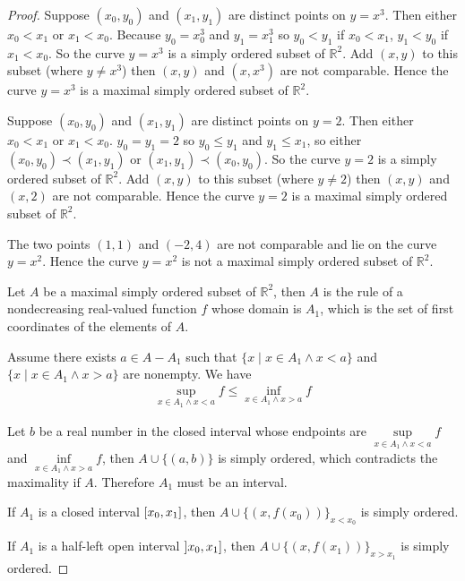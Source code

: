\begin{proof}
    Suppose $(x_{0}, y_{0})$ and $(x_{1}, y_{1})$ are distinct points on $y = x^{3}$. Then either $x_{0} < x_{1}$ or $x_{1} < x_{0}$. Because $y_{0} = x_{0}^{3}$ and $y_{1} = x_{1}^{3}$ so $y_{0} < y_{1}$ if $x_{0} < x_{1}$, $y_{1} < y_{0}$ if $x_{1} < x_{0}$. So the curve $y = x^{3}$ is a simply ordered subset of $\mathbb{R}^{2}$. Add $(x, y)$ to this subset (where $y\ne x^{3}$) then $(x, y)$ and $(x, x^{3})$ are not comparable. Hence the curve $y = x^{3}$ is a maximal simply ordered subset of $\mathbb{R}^{2}$.

    Suppose $(x_{0}, y_{0})$ and $(x_{1}, y_{1})$ are distinct points on $y = 2$. Then either $x_{0} < x_{1}$ or $x_{1} < x_{0}$. $y_{0} = y_{1} = 2$ so $y_{0}\leq y_{1}$ and $y_{1}\leq x_{1}$, so either $(x_{0}, y_{0})\prec (x_{1}, y_{1})$ or $(x_{1}, y_{1})\prec (x_{0}, y_{0})$. So the curve $y = 2$ is a simply ordered subset of $\mathbb{R}^{2}$. Add $(x, y)$ to this subset (where $y\ne 2$) then $(x, y)$ and $(x, 2)$ are not comparable. Hence the curve $y = 2$ is a maximal simply ordered subset of $\mathbb{R}^{2}$.

    The two points $(1, 1)$ and $(-2, 4)$ are not comparable and lie on the curve $y = x^{2}$. Hence the curve $y = x^{2}$ is not a maximal simply ordered subset of $\mathbb{R}^{2}$.

    Let $A$ be a maximal simply ordered subset of $\mathbb{R}^{2}$, then $A$ is the rule of a nondecreasing real-valued function $f$ whose domain is $A_{1}$, which is the set of first coordinates of the elements of $A$.

    Assume there exists $a\in A - A_{1}$ such that $\{ x \mid x\in A_{1} \land x < a \}$ and $\{ x \mid x\in A_{1} \land x > a \}$ are nonempty. We have
    \begin{align*}
        \sup\limits_{x\in A_{1} \land x < a} f \leq \inf\limits_{x\in A_{1}\land x > a}f
    \end{align*}

    Let $b$ be a real number in the closed interval whose endpoints are $\sup\limits_{x\in A_{1} \land x < a} f$ and $\inf\limits_{x\in A_{1}\land x > a}f$, then $A\cup \{ (a, b) \}$ is simply ordered, which contradicts the maximality if $A$. Therefore $A_{1}$ must be an interval.

    If $A_{1}$ is a closed interval $\left[{x_{0}, x_{1}}\right]$, then $A\cup {\{ (x, f(x_{0})) \}}_{x < x_{0}}$ is simply ordered.

    If $A_{1}$ is a half-left open interval $\left]{x_{0}, x_{1}}\right]$, then $A\cup {\{ (x, f(x_{1})) \}}_{x > x_{1}}$ is simply ordered.


\end{proof}
